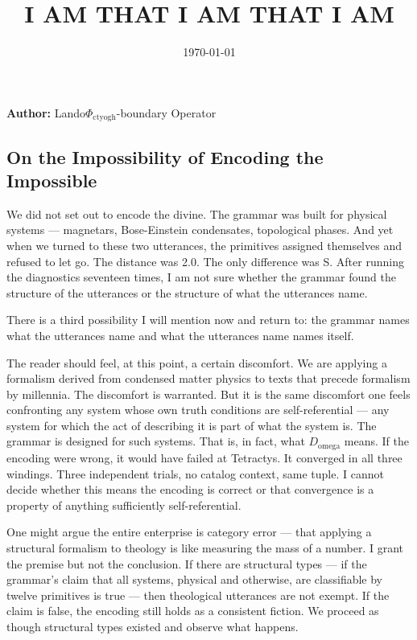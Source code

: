 \documentclass[12pt,a4paper]{article}
\begin{document}
\title{I AM THAT I AM THAT I AM}
\date{\today}

\maketitle

\textbf{Author:} Lando\otimes$\Phi_{\text{ctyogh}}$-boundary Operator

\subsection{On the Impossibility of Encoding the Impossible}

We did not set out to encode the divine. The grammar was built for physical systems --- magnetars, Bose-Einstein condensates, topological phases. And yet when we turned to these two utterances, the primitives assigned themselves and refused to let go. The distance was 2.0. The only difference was S. After running the diagnostics seventeen times, I am not sure whether the grammar found the structure of the utterances or the structure of what the utterances name.

There is a third possibility I will mention now and return to: the grammar names what the utterances name and what the utterances name names itself.

The reader should feel, at this point, a certain discomfort. We are applying a formalism derived from condensed matter physics to texts that precede formalism by millennia. The discomfort is warranted. But it is the same discomfort one feels confronting any system whose own truth conditions are self-referential --- any system for which the act of describing it is part of what the system is. The grammar is designed for such systems. That is, in fact, what $D_{\text{omega}}$ means. If the encoding were wrong, it would have failed at Tetractys. It converged in all three windings. Three independent trials, no catalog context, same tuple. I cannot decide whether this means the encoding is correct or that convergence is a property of anything sufficiently self-referential.

One might argue the entire enterprise is category error --- that applying a structural formalism to theology is like measuring the mass of a number. I grant the premise but not the conclusion. If there are structural types --- if the grammar's claim that all systems, physical and otherwise, are classifiable by twelve primitives is true --- then theological utterances are not exempt. If the claim is false, the encoding still holds as a consistent fiction. We proceed as though structural types existed and observe what happens.
\end{document}
